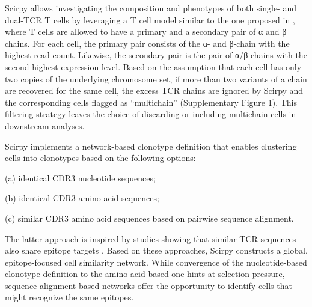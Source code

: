 \documentclass{article}
\begin{document}
Scirpy allows investigating the composition and phenotypes of both single- and dual-TCR T cells by leveraging a T cell model similar to the one proposed in \cite{Stubbington2016-kh}, where T cells are allowed to have a primary and a secondary pair of α and β chains. For each cell, the primary pair consists of the α- and β-chain with the highest read count. Likewise, the secondary pair is the pair of α/β-chains with the second highest expression level. Based on the assumption that each cell has only two copies of the underlying chromosome set, if more than two variants of a chain are recovered for the same cell, the excess TCR chains are ignored by Scirpy and the corresponding cells flagged as “multichain” (Supplementary Figure 1). This filtering strategy leaves the choice of discarding or including multichain cells in downstream analyses.\par

Scirpy implements a network-based clonotype definition that enables clustering cells into clonotypes based on the following options:\par
\hspace*{2\parindent}(a) identical CDR3 nucleotide sequences;\par
\hspace*{2\parindent}(b) identical CDR3 amino acid sequences;\par
\hspace*{2\parindent}(c) similar CDR3 amino acid sequences based on pairwise sequence alignment. \par

The latter approach is inspired by studies showing that similar TCR sequences also share epitope targets \cite{Glanville2017-ay, Dash2017-xt, Fischer_undated-cx}. Based on these approaches, Scirpy constructs a global, epitope-focused cell similarity network. While convergence of the nucleotide-based clonotype definition to the amino acid based one hints at selection pressure, sequence alignment based networks offer the opportunity to identify cells that might recognize the same epitopes.\par

\newpage

\printbibliography[title={Supplementary References}]
\end{document}
